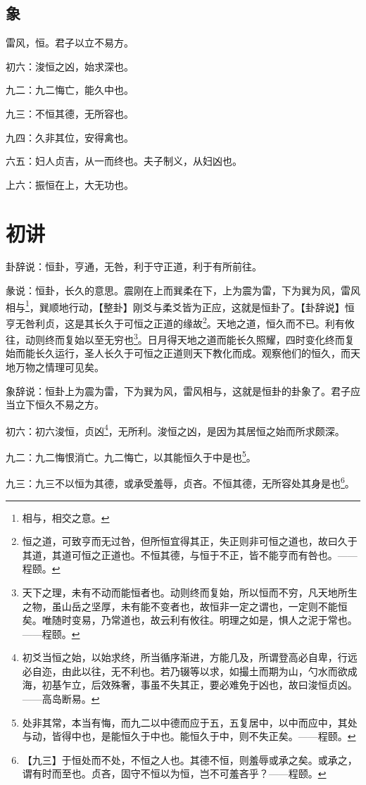 \documentclass[12pt,oneside]{book}
\begin{document}
\subsection{象}
雷风，恒。君子以立不易方。

初六：浚恒之凶，始求深也。

九二：九二悔亡，能久中也。

九三：不恒其德，无所容也。

九四：久非其位，安得禽也。

六五：妇人贞吉，从一而终也。夫子制义，从妇凶也。

上六：振恒在上，大无功也。

\section{初讲}
卦辞说：恒卦，亨通，无咎，利于守正道，利于有所前往。

彖说：恒卦，长久的意思。震刚在上而巽柔在下，上为震为雷，下为巽为风，雷风相与\footnote{相与，相交之意。}，巽顺地行动，【整卦】刚爻与柔爻皆为正应，这就是恒卦了。【卦辞说】恒亨无咎利贞，这是其长久于可恒之正道的缘故\footnote{恒之道，可致亨而无过咎，但所恒宜得其正，失正则非可恒之道也，故曰久于其道，其道可恒之正道也。不恒其德，与恒于不正，皆不能亨而有咎也。——程颐。}。天地之道，恒久而不已。利有攸往，动则终而复始以至无穷也\footnote{天下之理，未有不动而能恒者也。动则终而复始，所以恒而不穷，凡天地所生之物，虽山岳之坚厚，未有能不变者也，故恒非一定之谓也，一定则不能恒矣。唯随时变易，乃常道也，故云利有攸往。明理之如是，惧人之泥于常也。——程颐。}。日月得天地之道而能长久照耀，四时变化终而复始而能长久运行，圣人长久于可恒之正道则天下教化而成。观察他们的恒久，而天地万物之情理可见矣。

象辞说：恒卦上为震为雷，下为巽为风，雷风相与，这就是恒卦的卦象了。君子应当立下恒久不易之方。

初六：初六浚恒，贞凶\footnote{初爻当恒之始，以始求终，所当循序渐进，方能几及，所谓登高必自卑，行远必自迩，由此以往，无不利也。若乃辍等以求，如撮土而期为山，勺水而欲成海，初基乍立，后效殊奢，事虽不失其正，要必难免于凶也，故曰浚恒贞凶。——高岛断易。}，无所利。浚恒之凶，是因为其居恒之始而所求颇深。

九二：九二悔恨消亡。九二悔亡，以其能恒久于中是也\footnote{处非其常，本当有悔，而九二以中德而应于五，五复居中，以中而应中，其处与动，皆得中也，是能恒久于中也。能恒久于中，则不失正矣。——程颐。}。

九三：九三不以恒为其德，或承受羞辱，贞吝。不恒其德，无所容处其身是也\footnote{【九三】于恒处而不处，不恒之人也。其德不恒，则羞辱或承之矣。或承之，谓有时而至也。贞吝，固守不恒以为恒，岂不可羞吝乎？——程颐。}。
\end{document}
